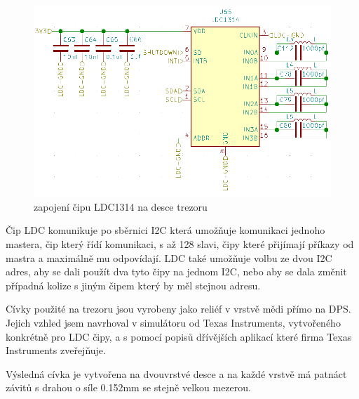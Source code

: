 \begin{figure}[htbp]
    \centering
    \includegraphics[width=\textwidth]{kapitoly/obrazky/E4/elektronika_tlakove_desky/moje_zapojeni.png}
    \caption{zapojení čipu LDC1314 na desce trezoru}
    \label{fig:E4-LDC}
\end{figure}

Čip LDC komunikuje po sběrnici I2C která umožňuje komunikaci jednoho mastera, čip který řídí komunikaci, s až 128 slavi, čipy které přijímají příkazy
od mastra a maximálně mu odpovídají. LDC také umožňuje volbu ze dvou I2C adres, aby se dali použít dva tyto čipy na jednom I2C, nebo aby se dala změnit 
případná kolize s jiným čipem který by měl stejnou adresu.

\newpage

Cívky použité na trezoru jsou vyrobeny jako reliéf v vrstvě mědi přímo na DPS. Jejich vzhled jsem navrhoval v simulátoru od Texas Instruments, 
vytvořeného konkrétně pro LDC čipy, a s pomocí popisů dřívějších aplikací které firma Texas Instruments zveřejňuje.


Výsledná cívka je vytvořena na dvouvrstvé desce a na každé vrstvě má patnáct závitů s drahou o síle 0.152mm se stejně velkou mezerou.

